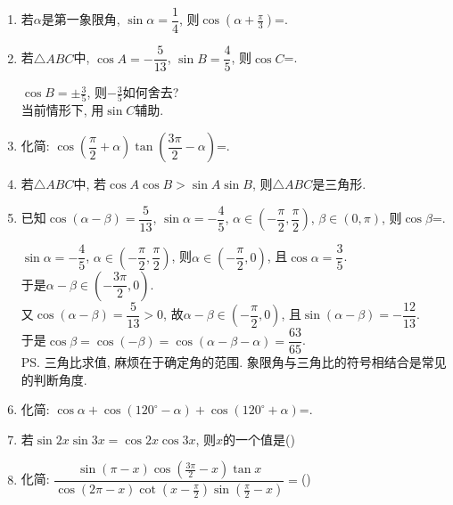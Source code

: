 \begin{enumerate}
\item 若$\alpha$是第一象限角, $\sin\alpha=\dfrac{1}{4}$, 则$\cos\left(\alpha+\frac{\pi}{3}\right)$=. 

\item 若$\triangle{ABC}$中, $\cos{A}=-\dfrac{5}{13}$, $\sin{B}=\dfrac{4}{5}$, 则$\cos{C}$=. 
\begin{jieda}
$\cos{B}=\pm\frac{3}{5}$, 则$-\frac{3}{5}$如何舍去? \\
当前情形下, 用$\sin{C}$辅助. 
\end{jieda}

\item 化简: $\cos\left(\dfrac{\pi}{2}+\alpha\right)\tan\left(\dfrac{3\pi}{2}-\alpha\right)$=\blkda{$-\cos\alpha$}. 

\item 若$\triangle{ABC}$中, 若$\cos{A}\cos{B}>\sin{A}\sin{B}$, 则$\triangle{ABC}$是三角形. 

\item 已知$\cos(\alpha-\beta)=\dfrac{5}{13}$, $\sin\alpha=-\dfrac{4}{5}$, $\alpha\in\left(-\dfrac{\pi}{2},\dfrac{\pi}{2}\right)$, 
$\beta\in(0,\pi)$, 则$\cos\beta$=. 
\begin{jieda}
$\sin\alpha=-\dfrac{4}{5}$, $\alpha\in\left(-\dfrac{\pi}{2},\dfrac{\pi}{2}\right)$, 则$\alpha\in\left(-\dfrac{\pi}{2},0\right)$, 且$\cos\alpha=\dfrac{3}{5}$. \\
于是$\alpha-\beta\in\left(-\dfrac{3\pi}{2},0\right)$. \\
又$\cos(\alpha-\beta)=\dfrac{5}{13}>0$, 故$\alpha-\beta\in\left(-\dfrac{\pi}{2},0\right)$, 且$\sin(\alpha-\beta)=-\dfrac{12}{13}$. \\
于是$\cos\beta=\cos(-\beta)=\cos(\alpha-\beta-\alpha)=\dfrac{63}{65}$. \\
\ps 三角比求值, 麻烦在于确定角的范围. 象限角与三角比的符号相结合是常见的判断角度. 
\end{jieda}


\item 化简: $\cos\alpha+\cos(120^{\circ}-\alpha)+\cos(120^{\circ}+\alpha)$=. 

\item 若$\sin2x\sin3x=\cos2x\cos3x$, 则$x$的一个值是\dotfill()

\item 化简: $\dfrac{\sin(\pi-x)\cos(\frac{3\pi}{2}-x)\tan{x}}{\cos(2\pi-x)\cot(x-\frac{\pi}{2})\sin(\frac{\pi}{2}-x)}=$\dotfill()


\end{enumerate}
